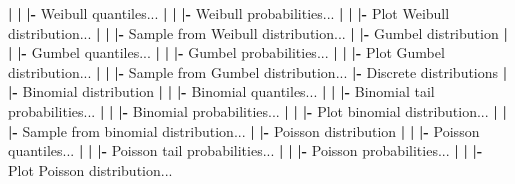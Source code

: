 \documentclass[12pt,]{krantz}
\newenvironment{Shaded}{\begin{snugshade}}{\end{snugshade}}
\newcommand{\ErrorTok}[1]{\textcolor[rgb]{0.64,0.00,0.00}{\textbf{#1}}}
\newcommand{\NormalTok}[1]{#1}
\newcommand{\OperatorTok}[1]{\textcolor[rgb]{0.81,0.36,0.00}{\textbf{#1}}}
\newcommand{\StringTok}[1]{\textcolor[rgb]{0.31,0.60,0.02}{#1}}
\begin{document}
\begin{Shaded}
\begin{Highlighting}[]
  \OperatorTok{|}\StringTok{ }\ErrorTok{|}\StringTok{ }\ErrorTok{|}\OperatorTok{-}\StringTok{ }\NormalTok{Weibull quantiles...}
  \OperatorTok{|}\StringTok{ }\ErrorTok{|}\StringTok{ }\ErrorTok{|}\OperatorTok{-}\StringTok{ }\NormalTok{Weibull probabilities...}
  \OperatorTok{|}\StringTok{ }\ErrorTok{|}\StringTok{ }\ErrorTok{|}\OperatorTok{-}\StringTok{ }\NormalTok{Plot Weibull distribution...}
  \OperatorTok{|}\StringTok{ }\ErrorTok{|}\StringTok{ }\ErrorTok{|}\OperatorTok{-}\StringTok{ }\NormalTok{Sample from Weibull distribution...}
  \OperatorTok{|}\StringTok{ }\ErrorTok{|}\OperatorTok{-}\StringTok{ }\NormalTok{Gumbel distribution}
  \OperatorTok{|}\StringTok{ }\ErrorTok{|}\StringTok{ }\ErrorTok{|}\OperatorTok{-}\StringTok{ }\NormalTok{Gumbel quantiles...}
  \OperatorTok{|}\StringTok{ }\ErrorTok{|}\StringTok{ }\ErrorTok{|}\OperatorTok{-}\StringTok{ }\NormalTok{Gumbel probabilities...}
  \OperatorTok{|}\StringTok{ }\ErrorTok{|}\StringTok{ }\ErrorTok{|}\OperatorTok{-}\StringTok{ }\NormalTok{Plot Gumbel distribution...}
  \OperatorTok{|}\StringTok{ }\ErrorTok{|}\StringTok{ }\ErrorTok{|}\OperatorTok{-}\StringTok{ }\NormalTok{Sample from Gumbel distribution...}
  \OperatorTok{|-}\StringTok{ }\NormalTok{Discrete distributions}
  \OperatorTok{|}\StringTok{ }\ErrorTok{|}\OperatorTok{-}\StringTok{ }\NormalTok{Binomial distribution}
  \OperatorTok{|}\StringTok{ }\ErrorTok{|}\StringTok{ }\ErrorTok{|}\OperatorTok{-}\StringTok{ }\NormalTok{Binomial quantiles...}
  \OperatorTok{|}\StringTok{ }\ErrorTok{|}\StringTok{ }\ErrorTok{|}\OperatorTok{-}\StringTok{ }\NormalTok{Binomial tail probabilities...}
  \OperatorTok{|}\StringTok{ }\ErrorTok{|}\StringTok{ }\ErrorTok{|}\OperatorTok{-}\StringTok{ }\NormalTok{Binomial probabilities...}
  \OperatorTok{|}\StringTok{ }\ErrorTok{|}\StringTok{ }\ErrorTok{|}\OperatorTok{-}\StringTok{ }\NormalTok{Plot binomial distribution...}
  \OperatorTok{|}\StringTok{ }\ErrorTok{|}\StringTok{ }\ErrorTok{|}\OperatorTok{-}\StringTok{ }\NormalTok{Sample from binomial distribution...}
  \OperatorTok{|}\StringTok{ }\ErrorTok{|}\OperatorTok{-}\StringTok{ }\NormalTok{Poisson distribution}
  \OperatorTok{|}\StringTok{ }\ErrorTok{|}\StringTok{ }\ErrorTok{|}\OperatorTok{-}\StringTok{ }\NormalTok{Poisson quantiles...}
  \OperatorTok{|}\StringTok{ }\ErrorTok{|}\StringTok{ }\ErrorTok{|}\OperatorTok{-}\StringTok{ }\NormalTok{Poisson tail probabilities...}
  \OperatorTok{|}\StringTok{ }\ErrorTok{|}\StringTok{ }\ErrorTok{|}\OperatorTok{-}\StringTok{ }\NormalTok{Poisson probabilities...}
  \OperatorTok{|}\StringTok{ }\ErrorTok{|}\StringTok{ }\ErrorTok{|}\OperatorTok{-}\StringTok{ }\NormalTok{Plot Poisson distribution...}

\end{Highlighting}
\end{Shaded}
\end{document}
